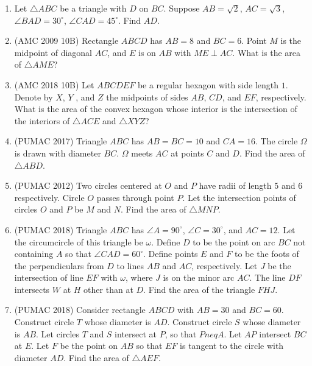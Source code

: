 \documentclass[12pt]{scrartcl}
\begin{document}
\begin{enumerate}[resume]
    \item Let $\triangle ABC$ be a triangle with $D$ on $BC$. Suppose $AB = \sqrt{2}$, $AC = \sqrt{3}$, $\angle BAD = 30^\circ$, $\angle CAD = 45^\circ$. Find $AD$.

    \item (AMC 2009 10B) Rectangle $ABCD$ has $AB = 8$ and $BC = 6$. Point $M$ is the midpoint of diagonal $AC$, and $E$ is on $AB$ with $ME \perp AC$. What is the area of $\triangle AME$?


    \item (AMC 2018 10B) Let $ABCDEF$ be a regular hexagon with side length $1$. Denote by $X$, $Y$ , and $Z$ the midpoints of sides $AB$, $CD$, and $EF$, respectively. What is the area of the convex hexagon whose interior is the intersection of the interiors of $\triangle ACE$ and $\triangle XYZ$?


    \item (PUMAC 2017) Triangle $ABC$ has $AB = BC = 10$ and $CA = 16$. The circle $\Omega$ is drawn with diameter $BC$. $\Omega$ meets $AC$ at points $C$ and $D$. Find the area of $\triangle ABD$.


    \item (PUMAC 2012) Two circles centered at $O$ and $P$ have radii of length $5$ and $6$ respectively. Circle $O$ passes through point $P$. Let the intersection points of circles $O$ and $P$ be $M$ and $N$. Find the area of $\triangle MNP$.


    \item (PUMAC 2018) Triangle $ABC$ has $\angle A = 90^\circ$, $\angle C = 30^\circ$, and $AC = 12$. Let the circumcircle of this triangle be $\omega$. Define $D$ to be the point on arc $BC$ not containing $A$ so that $\angle CAD = 60^\circ$. Define points $E$ and $F$ to be the foots of the perpendiculars from $D$ to lines $AB$ and $AC$, respectively. Let $J$ be the intersection of line $EF$ with $\omega$, where $J$ is on the minor arc $AC$. The line $DF$ intersects $W$ at $H$ other than at $D$. Find the area of the triangle $FHJ$.


    \item (PUMAC 2018) Consider rectangle $ABCD$ with $AB = 30$ and $BC = 60$. Construct circle $T$ whose diameter is $AD$. Construct circle $S$ whose diameter is $AB$. Let circles $T$ and $S$ intersect at $P$, so that $Pneq A$. Let $AP$ intersect $BC$ at $E$. Let $F$ be the point on $AB$ so that $EF$ is tangent to the circle with diameter $AD$. Find the area of $\triangle AEF$.
\end{enumerate}
\end{document}
